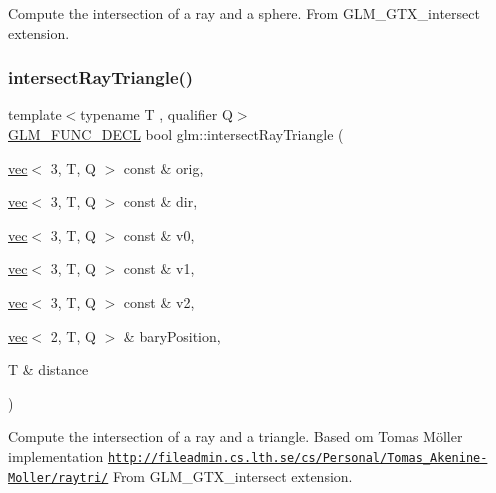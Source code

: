 Compute the intersection of a ray and a sphere. From G\+L\+M\+\_\+\+G\+T\+X\+\_\+intersect extension. \mbox{\label{group__gtx__intersect_ga65bf2c594482f04881c36bc761f9e946}} 
\subsubsection{\texorpdfstring{intersect\+Ray\+Triangle()}{intersectRayTriangle()}}
{\footnotesize\ttfamily template$<$typename T , qualifier Q$>$ \\
\mbox{\hyperlink{setup_8hpp_ab2d052de21a70539923e9bcbf6e83a51}{G\+L\+M\+\_\+\+F\+U\+N\+C\+\_\+\+D\+E\+CL}} bool glm\+::intersect\+Ray\+Triangle (\begin{DoxyParamCaption}\item[{\mbox{\hyperlink{structglm_1_1vec}{vec}}$<$ 3, T, Q $>$ const \&}]{orig,  }\item[{\mbox{\hyperlink{structglm_1_1vec}{vec}}$<$ 3, T, Q $>$ const \&}]{dir,  }\item[{\mbox{\hyperlink{structglm_1_1vec}{vec}}$<$ 3, T, Q $>$ const \&}]{v0,  }\item[{\mbox{\hyperlink{structglm_1_1vec}{vec}}$<$ 3, T, Q $>$ const \&}]{v1,  }\item[{\mbox{\hyperlink{structglm_1_1vec}{vec}}$<$ 3, T, Q $>$ const \&}]{v2,  }\item[{\mbox{\hyperlink{structglm_1_1vec}{vec}}$<$ 2, T, Q $>$ \&}]{bary\+Position,  }\item[{T \&}]{distance }\end{DoxyParamCaption})}

Compute the intersection of a ray and a triangle. Based om Tomas Möller implementation \href{http://fileadmin.cs.lth.se/cs/Personal/Tomas_Akenine-Moller/raytri/}{\tt http\+://fileadmin.\+cs.\+lth.\+se/cs/\+Personal/\+Tomas\+\_\+\+Akenine-\/\+Moller/raytri/} From G\+L\+M\+\_\+\+G\+T\+X\+\_\+intersect extension. 